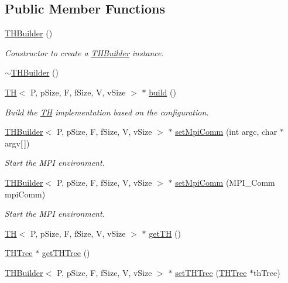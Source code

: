 \subsection*{Public Member Functions}
\begin{DoxyCompactItemize}
\item 
\hyperlink{classTHBuilder_a2d967b012c3f11d9cb91967a54cf08ac}{T\+H\+Builder} ()
\begin{DoxyCompactList}\small\item\em Constructor to create a \hyperlink{classTHBuilder}{T\+H\+Builder} instance. \end{DoxyCompactList}\item 
\hyperlink{classTHBuilder_a856d494431279af63670799fe3917cc3}{$\sim$\+T\+H\+Builder} ()
\item 
\hyperlink{classTH}{TH}$<$ P, p\+Size, F, f\+Size, V, v\+Size $>$ $\ast$ \hyperlink{classTHBuilder_afbfe480878be27deb1b9386046c67376}{build} ()
\begin{DoxyCompactList}\small\item\em Build the \hyperlink{classTH}{TH} implementation based on the configuration. \end{DoxyCompactList}\item 
\hyperlink{classTHBuilder}{T\+H\+Builder}$<$ P, p\+Size, F, f\+Size, V, v\+Size $>$ $\ast$ \hyperlink{classTHBuilder_a35119e0e5d0f1c1dd61dfe0adbcdce05}{set\+Mpi\+Comm} (int argc, char $\ast$argv\mbox{[}$\,$\mbox{]})
\begin{DoxyCompactList}\small\item\em Start the M\+PI environment. \end{DoxyCompactList}\item 
\hyperlink{classTHBuilder}{T\+H\+Builder}$<$ P, p\+Size, F, f\+Size, V, v\+Size $>$ $\ast$ \hyperlink{classTHBuilder_a44f1ca2b80b90f9481d2e8e6b7062289}{set\+Mpi\+Comm} (M\+P\+I\+\_\+\+Comm mpi\+Comm)
\begin{DoxyCompactList}\small\item\em Start the M\+PI environment. \end{DoxyCompactList}\item 
\hyperlink{classTH}{TH}$<$ P, p\+Size, F, f\+Size, V, v\+Size $>$ $\ast$ \hyperlink{classTHBuilder_ae812723b4b9a95f62db532c203018080}{get\+TH} ()
\item 
\hyperlink{classTHTree}{T\+H\+Tree} $\ast$ \hyperlink{classTHBuilder_a6ad815c9e35b81b9b8f6507b6bdac5bf}{get\+T\+H\+Tree} ()
\item 
\hyperlink{classTHBuilder}{T\+H\+Builder}$<$ P, p\+Size, F, f\+Size, V, v\+Size $>$ $\ast$ \hyperlink{classTHBuilder_a60f69568fb3ec70319c371b88d595b22}{set\+T\+H\+Tree} (\hyperlink{classTHTree}{T\+H\+Tree} $\ast$th\+Tree)

\end{DoxyCompactItemize}
